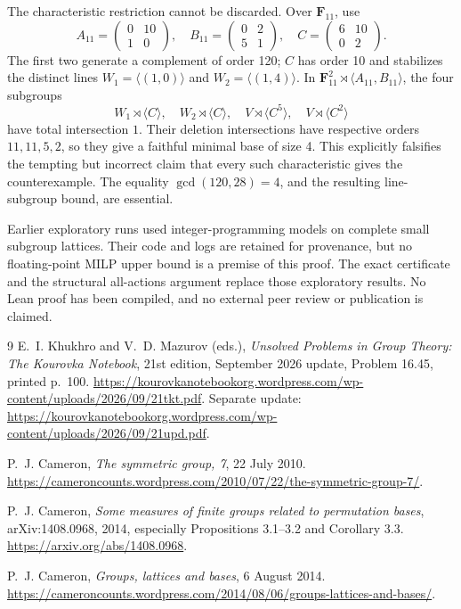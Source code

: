 \documentclass[11pt]{article}
\theoremstyle{remark}\newtheorem{remark}[theorem]{Remark}
\newcommand{\F}{\mathbf F}
\begin{document}
The characteristic restriction cannot be discarded. Over $\F_{11}$, use
\[
 A_{11}=\begin{pmatrix}0&10\\1&0\end{pmatrix},\quad
 B_{11}=\begin{pmatrix}0&2\\5&1\end{pmatrix},\quad
 C=\begin{pmatrix}6&10\\0&2\end{pmatrix}.
\]
The first two generate a complement of order 120; $C$ has order 10 and
stabilizes the distinct lines $W_1=\langle(1,0)\rangle$ and
$W_2=\langle(1,4)\rangle$. In $\F_{11}^2\rtimes\langle A_{11},B_{11}\rangle$,
the four subgroups
\[
 W_1\rtimes\langle C\rangle,\quad
 W_2\rtimes\langle C\rangle,\quad
 V\rtimes\langle C^5\rangle,\quad
 V\rtimes\langle C^2\rangle
\]
have total intersection $1$. Their deletion intersections have respective
orders $11,11,5,2$, so they give a faithful minimal base of size 4. This
explicitly falsifies the tempting but incorrect claim that every such
characteristic gives the counterexample. The equality
$\gcd(120,28)=4$, and the resulting line-subgroup bound, are essential.

Earlier exploratory runs used integer-programming models on complete small
subgroup lattices. Their code and logs are retained for provenance, but no
floating-point MILP upper bound is a premise of this proof. The exact
certificate and the structural all-actions argument replace those exploratory
results. No Lean proof has been compiled, and no external peer review or
publication is claimed.

\begin{thebibliography}{9}
E.~I. Khukhro and V.~D. Mazurov (eds.),
\emph{Unsolved Problems in Group Theory: The Kourovka Notebook}, 21st edition,
September 2026 update, Problem 16.45, printed p.~100.
\url{https://kourovkanotebookorg.wordpress.com/wp-content/uploads/2026/09/21tkt.pdf}.
Separate update:
\url{https://kourovkanotebookorg.wordpress.com/wp-content/uploads/2026/09/21upd.pdf}.

P.~J. Cameron, \emph{The symmetric group, 7}, 22 July 2010.
\url{https://cameroncounts.wordpress.com/2010/07/22/the-symmetric-group-7/}.

P.~J. Cameron, \emph{Some measures of finite groups related to permutation
bases}, arXiv:1408.0968, 2014, especially Propositions 3.1--3.2 and
Corollary 3.3. \url{https://arxiv.org/abs/1408.0968}.

P.~J. Cameron, \emph{Groups, lattices and bases}, 6 August 2014.
\url{https://cameroncounts.wordpress.com/2014/08/06/groups-lattices-and-bases/}.
\end{thebibliography}
\end{document}
